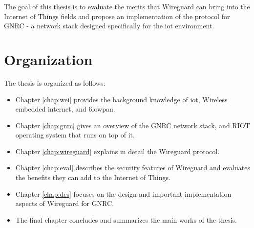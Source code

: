   The goal of this thesis is to evaluate the merits that Wireguard can bring into the Internet
  of Things fields and propose an implementation of the protocol for GNRC - a network stack designed
  specifically for the \gls{iot} environment.

\section{Organization}
  The thesis is organized as follows:
  \begin{itemize}
    \item Chapter \ref{chap:wei} provides the background knowledge of \gls{iot}, Wireless embedded internet, and
    \gls{6lowpan}.
    \item Chapter \ref{chap:gnrc} gives an overview of the GNRC network stack, and RIOT operating
    system that runs on top of it.
    \item Chapter \ref{chap:wireguard} explains in detail the Wireguard protocol.
    \item Chapter \ref{chap:eval} describes the security features of Wireguard and evaluates
    the benefits they can add to the Internet of Things.
    \item Chapter \ref{chap:des} focuses on the design and important implementation aspects of
    Wireguard for GNRC.
    \item The final chapter concludes and summarizes the main works of the thesis.
  \end{itemize}